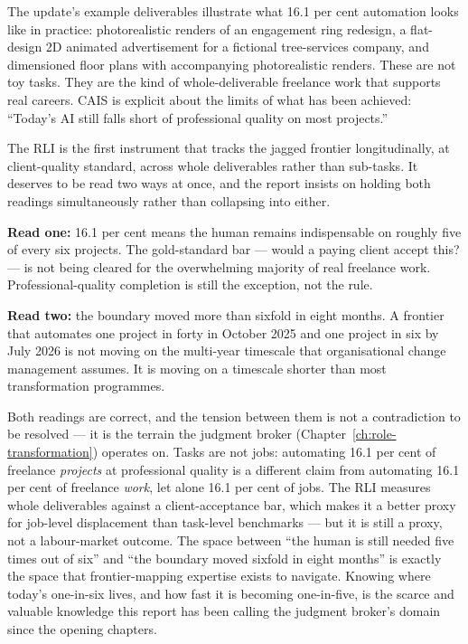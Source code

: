 The update's example deliverables illustrate what 16.1 per cent automation looks like in practice: photorealistic renders of an engagement ring redesign, a flat-design 2D animated advertisement for a fictional tree-services company, and dimensioned floor plans with accompanying photorealistic renders. These are not toy tasks. They are the kind of whole-deliverable freelance work that supports real careers. CAIS is explicit about the limits of what has been achieved: ``Today's AI still falls short of professional quality on most projects.''

\begin{keyinsight}[title={The First Longitudinal Quantification of the Jagged Frontier}]
The RLI is the first instrument that tracks the jagged frontier longitudinally, at client-quality standard, across whole deliverables rather than sub-tasks. It deserves to be read two ways at once, and the report insists on holding both readings simultaneously rather than collapsing into either.

\textbf{Read one:} 16.1 per cent means the human remains indispensable on roughly five of every six projects. The gold-standard bar --- would a paying client accept this? --- is not being cleared for the overwhelming majority of real freelance work. Professional-quality completion is still the exception, not the rule.

\textbf{Read two:} the boundary moved more than sixfold in eight months. A frontier that automates one project in forty in October 2025 and one project in six by July 2026 is not moving on the multi-year timescale that organisational change management assumes. It is moving on a timescale shorter than most transformation programmes.

Both readings are correct, and the tension between them is not a contradiction to be resolved --- it is the terrain the judgment broker (Chapter~\ref{ch:role-transformation}) operates on. Tasks are not jobs: automating 16.1 per cent of freelance \emph{projects} at professional quality is a different claim from automating 16.1 per cent of freelance \emph{work}, let alone 16.1 per cent of jobs. The RLI measures whole deliverables against a client-acceptance bar, which makes it a better proxy for job-level displacement than task-level benchmarks --- but it is still a proxy, not a labour-market outcome. The space between ``the human is still needed five times out of six'' and ``the boundary moved sixfold in eight months'' is exactly the space that frontier-mapping expertise exists to navigate. Knowing where today's one-in-six lives, and how fast it is becoming one-in-five, is the scarce and valuable knowledge this report has been calling the judgment broker's domain since the opening chapters.
\end{keyinsight}

